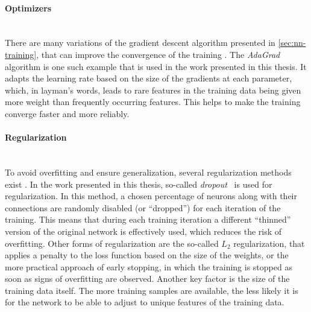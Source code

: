 
\paragraph{Optimizers}\mbox{}\\
There are many variations of the gradient descent algorithm presented in \cref{sec:nn-training}, that can improve the convergence of the training . The \emph{AdaGrad}~ algorithm is one such example that is used in the work presented in this thesis. It adapts the learning rate based on the size of the gradients at each parameter, which, in layman's words, leads to rare features in the training data being given more weight than frequently occurring features. This helps to make the training converge faster and more reliably.

\paragraph{Regularization}\mbox{}\\
To avoid overfitting and ensure generalization, several regularization methods exist . 
In the work presented in this thesis, so-called \emph{dropout}~ is used for regularization. In this method, a chosen percentage of neurons along with their connections are randomly disabled (or ``dropped'') for each iteration of the training. This means that during each training iteration a different ``thinned'' version of the original network is effectively used, which reduces the risk of overfitting. 
Other forms of regularization are the so-called $L_2$ regularization, that applies a penalty to the loss function based on the size of the weights, or the more practical approach of early stopping, in which the training is stopped as soon as signs of overfitting are observed. 
Another key factor is the size of the training data itself. The more training samples are available, the less likely it is for the network to be able to adjust to unique features of the training data.


